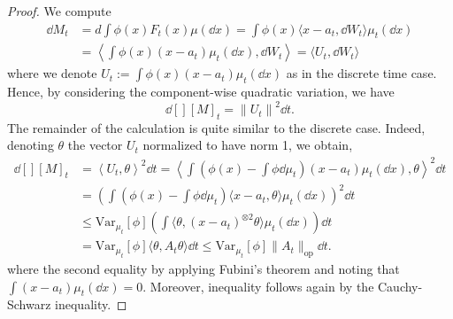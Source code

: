 

\begin{proof}
  We compute
  \begin{align*}
    \dd M_t & = d \int \phi(x) F_t(x) \mu(\dd x) = \int \phi(x) \langle x - a_t, \dd W_t \rangle \mu_t(\dd x)\\
    & = \left\langle \int \phi(x)(x - a_t)\mu_t(\dd x), \dd W_t\right\rangle = \langle U_t, \dd W_t\rangle
  \end{align*}
  where we denote \(U_t := \int \phi(x)(x - a_t)\mu_t(\dd x)\) as in the discrete time case.
  Hence, by considering the component-wise quadratic variation, we have
  \begin{equation}\label{eq:diff_qvar}
    \dd[] [M]_t = \left\| U_t \right\|^2 \dd t.
  \end{equation}
  The remainder of the calculation is quite similar to the discrete case. Indeed, denoting \(\theta\) the vector 
  \(U_t\) normalized to have norm 1, we obtain,
  \begin{equation}\label{eq:red_a}
    \begin{split}
      \dd[] [M]_t & = \left\langle U_t, \theta \right\rangle^2 \dd t
        = \left\langle \int \left(\phi(x) - \int \phi \dd \mu_t\right)(x - a_t)\mu_t(\dd x), \theta\right\rangle^2 \dd t\\
      & = \left(\int \left(\phi(x) - \int \phi \dd \mu_t\right) \langle x - a_t, \theta\rangle \mu_t(\dd x)\right)^2 \dd t\\
      & \le \text{Var}_{\mu_t}[\phi] \left(\int \langle\theta, (x - a_t)^{\otimes 2} \theta\rangle \mu_t(\dd x)\right) \dd t\\
      & = \text{Var}_{\mu_t}[\phi] \langle\theta, A_t \theta\rangle\dd t \le \text{Var}_{\mu_t}[\phi] \|A_t\|_{\text{op}} \dd t.
    \end{split}
  \end{equation}
  where the second equality by applying Fubini's theorem and noting that \(\int (x - a_t) \mu_t(\dd x) = 0\). 
  Moreover, inequality follows again by the Cauchy-Schwarz inequality.
\end{proof}

